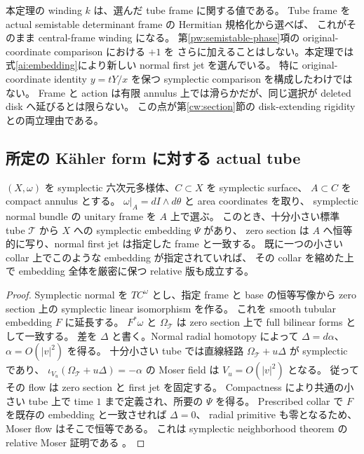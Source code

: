 \begin{remark}
本定理の winding $k$ は、選んだ tube frame に関する値である。
Tube frame を actual semistable determinant frame の Hermitian 規格化から選べば、
これがそのまま central-frame winding になる。
第\ref{pw:semistable-phase}項の original-coordinate comparison における $+1$ を
さらに加えることはしない。本定理では式\eqref{ai:embedding}により新しい normal first jet を選んでいる。
特に original-coordinate identity $y=tY/x$ を保つ symplectic comparison を構成したわけではない。
Frame と action は有限 annulus 上では滑らかだが、同じ選択が deleted disk へ延びるとは限らない。
この点が第\ref{cw:section}節の disk-extending rigidity との両立理由である。
\end{remark}

\subsection{所定の K\"ahler form に対する actual tube}

\begin{lemma}
\label{ai:actual-tube}
$(X,\omega)$ を symplectic 六次元多様体、$C\subset X$ を symplectic surface、
$A\subset C$ を compact annulus とする。
$\omega|_A=dI\wedge d\theta$ と area coordinates を取り、
symplectic normal bundle の unitary frame を $A$ 上で選ぶ。
このとき、十分小さい標準 tube $\mathcal T$ から $X$ への symplectic embedding $\Psi$ があり、
zero section は $A$ へ恒等的に写り、normal first jet は指定した frame と一致する。
既に一つの小さい collar 上でこのような embedding が指定されていれば、
その collar を縮めた上で embedding 全体を厳密に保つ relative 版も成立する。
\end{lemma}

\begin{proof}
Symplectic normal を $TC^\omega$ とし、指定 frame と base の恒等写像から
zero section 上の symplectic linear isomorphism を作る。
これを smooth tubular embedding $F$ に延長する。
$F^*\omega$ と $\Omega_{\mathcal T}$ は zero section 上で full bilinear forms として一致する。
差を $\Delta$ と書く。Normal radial homotopy によって
$\Delta=d\alpha$、$\alpha=O(|v|^2)$ を得る。
十分小さい tube では直線経路 $\Omega_{\mathcal T}+u\Delta$ が symplectic であり、
$\iota_{V_u}(\Omega_{\mathcal T}+u\Delta)=-\alpha$ の Moser field は $V_u=O(|v|^2)$ となる。
従ってその flow は zero section と first jet を固定する。
Compactness により共通の小さい tube 上で time $1$ まで定義され、所要の $\Psi$ を得る。
Prescribed collar で $F$ を既存の embedding と一致させれば $\Delta=0$、
radial primitive も零となるため、Moser flow はそこで恒等である。
これは symplectic neighborhood theorem の relative Moser 証明である
\cite[\S7.3, Theorem 7.4]{cds-local}。
\end{proof}

